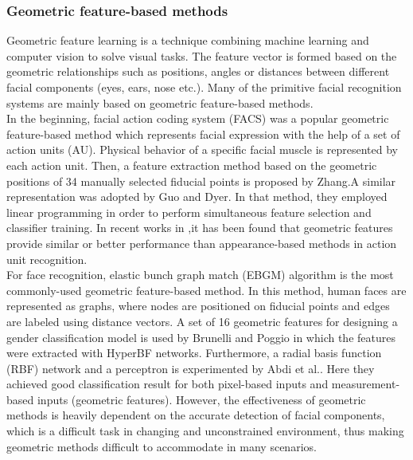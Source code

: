 \documentclass[12pt]{article}
\begin{document}
\subsubsection{Geometric feature-based methods}
\noindent Geometric feature learning is a technique combining machine learning and computer vision to solve visual tasks\cite{wiki:geometry}. The feature vector is formed based on the
geometric relationships such as positions, angles or distances between different
facial components (eyes, ears, nose etc.). Many of the primitive facial recognition systems are mainly based on geometric feature-based methods.\\
\linebreak
\noindent In the beginning, facial action coding system (FACS)\cite{facs} was a
popular geometric feature-based method which represents facial expression with
the help of a set of action units (AU). Physical
behavior of a specific facial muscle is represented by each action unit. Then, a feature extraction method based on the geometric positions of 34 manually selected fiducial points is proposed by Zhang\cite{facialPoints}.A similar representation was adopted by Guo and Dyer\cite{gdGuo}. In that method, they
employed linear programming in order to perform simultaneous feature selection
and classifier training. In recent works in\cite{falscv} ,it has been found that geometric
features provide similar or better performance than appearance-based methods
in action unit recognition.\\
\linebreak
\noindent For face recognition, elastic bunch graph match (EBGM)\cite{ebgm} algorithm is the
most commonly-used geometric feature-based method. In this method, human
faces are represented as graphs, where nodes are positioned on fiducial points and
edges are labeled using distance vectors. A set of 16 geometric features for designing a gender
classification model is used by Brunelli
and Poggio\cite{Poggio_hyberbfnetworks} in which the features were extracted with HyperBF networks. Furthermore, a radial basis function (RBF) network and a
perceptron is experimented by Abdi et al.\cite{moreAboutmanWoman}. Here they achieved good classification result for both pixel-based inputs
and measurement-based inputs (geometric features). However, the effectiveness of geometric methods is heavily dependent on the
accurate detection of facial components, which is a difficult task in changing and
unconstrained environment, thus making geometric methods difficult to accommodate in many scenarios.
\end{document}
